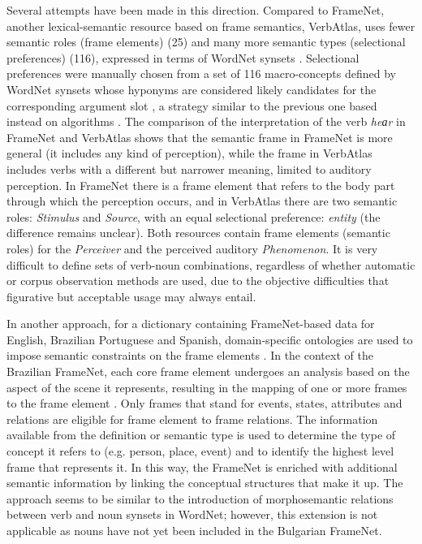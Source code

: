 \documentclass[output=paper,colorlinks,citecolor=brown]{langscibook}
\begin{document}
Several attempts have been made in this direction. Compared to FrameNet, another lexical-semantic resource based on frame semantics, VerbAtlas, uses fewer semantic roles (frame elements) (25) and many more semantic types (selectional preferences) (116), expressed in terms of WordNet synsets \citep[627]{di-fabio-etal-2019-verbatlas}. Selectional preferences were manually chosen from a set of 116 macro-concepts defined by WordNet synsets whose hyponyms are considered likely candidates for the corresponding argument slot \citep[627]{di-fabio-etal-2019-verbatlas},  a strategy similar to the previous one based instead on algorithms \citep{agirre-martinez-2001-learning}. The comparison of the interpretation of the verb \textit{heаr} in FrameNet and VerbAtlas shows that the semantic frame in FrameNet  is more general (it includes any kind of perception), while the frame in VerbAtlas includes verbs with a different but narrower meaning, limited to auditory perception. In FrameNet there is a frame element that refers to the body part through which the perception occurs, and in VerbAtlas there are two semantic roles: \emph{Stimulus} and \emph{Source}, with an equal selectional preference: \emph{entity} (the difference remains unclear). Both resources contain frame elements (semantic roles) for the \emph{Perceiver} and the perceived auditory \emph{Phenomenon}. It is very difficult to define sets of verb-noun combinations, regardless of whether automatic or corpus observation methods are used, due to the objective difficulties that figurative but acceptable usage may always entail.

In another approach, for a dictionary containing FrameNet-based data for English, Brazilian Portuguese and Spanish, domain-specific ontologies are used to impose semantic constraints on the frame elements \citep{Hauck}. 
In the context of the Brazilian FrameNet, each core frame element undergoes an analysis based on the aspect of the scene it represents, resulting in the mapping of one or more frames to the frame element \citep{Torrent}. Only frames that stand for events, states, attributes and relations are eligible for frame element to frame relations. The information available from the definition or semantic type is used to determine the type of concept it refers to (e.g. person, place, event) and to identify the highest level frame that represents it. In this way, the FrameNet is enriched with additional semantic information by linking the conceptual structures that make it up. The approach seems to be similar to the introduction of morphosemantic relations between verb and noun synsets in WordNet; however, this extension is not applicable as nouns have not yet been included in the Bulgarian FrameNet.
\end{document}
